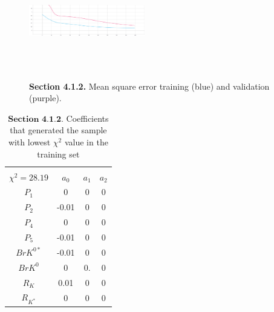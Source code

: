 \documentclass[a4paper,fleqn]{cas-dc}
\begin{document}
\begin{figure}
	\centering
	\includegraphics[width=0.45\textwidth,height=5cm]{images/epoch_mean_squared_error.pdf}
	\caption{\textbf{Section 4.1.2.} Mean square error training (blue) and validation (purple).}
	\label{FIG:exp2MeanSquareError}
\end{figure}


\begin{table}
	\begin{tabular}{ |c|c|c|c|  } 
		\hline
		\small
		\makecell{\(C_9 = -0.89\), \(C_{10} = 0.11\) \\ \(\chi^2 = 28.19 \)}\normalsize
		& \textbf{\(a_0\)} & \textbf{\(a_1\)} & \textbf{\(a_2\)}\\
		\hline
		\(P_1\) & 0 & 0 & 0 \\
		\hline
		\(P_2\) & -0.01 & 0 & 0 \\	
		\hline
		\(P_4\) & 0 &   0 &  0 \\
		\hline
		\(P_5\) & -0.01 &   0 &   0 \\		
		\hline
		\(BrK^{0*}\) & -0.01 & 0 & 0 \\		
		\hline
		\(BrK^{0}\) & 0 & 0.&   0 \\		
		\hline
		
		\(R_{K}\) & 0.01  & 0 &    0 \\
		\hline
		
		\(R_{K^*}\) & 0 & 0 &    0 \\		
		\hline
	\end{tabular}
	\caption{\label{tab:NNExp2BestSample} \(\textbf{Section 4.1.2.}\) Coefficients that generated the sample with lowest \(\chi^2 \) value in the training set}
\end{table}
\end{document}
